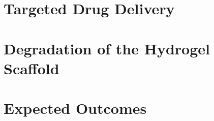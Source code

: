 \documentclass[
    letterpaper,
    10pt,
    unnumberedsections,
    twoside
]{LTJournalArticle}
\begin{document}
    \section{Targeted Drug Delivery}

    

    \section{Degradation of the Hydrogel Scaffold}

    


    

    

    \section{Expected Outcomes}

    

    \onecolumn
    \printbibliography
\end{document}
